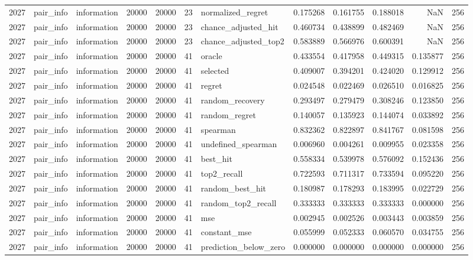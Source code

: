 \begin{tabular}{rllrrrlrrrrr}
2027 & pair_info & information & 20000 & 20000 & 23 & normalized_regret & 0.175268 & 0.161755 & 0.188018 & NaN & 256 \\
2027 & pair_info & information & 20000 & 20000 & 23 & chance_adjusted_hit & 0.460734 & 0.438899 & 0.482469 & NaN & 256 \\
2027 & pair_info & information & 20000 & 20000 & 23 & chance_adjusted_top2 & 0.583889 & 0.566976 & 0.600391 & NaN & 256 \\
2027 & pair_info & information & 20000 & 20000 & 41 & oracle & 0.433554 & 0.417958 & 0.449315 & 0.135877 & 256 \\
2027 & pair_info & information & 20000 & 20000 & 41 & selected & 0.409007 & 0.394201 & 0.424020 & 0.129912 & 256 \\
2027 & pair_info & information & 20000 & 20000 & 41 & regret & 0.024548 & 0.022469 & 0.026510 & 0.016825 & 256 \\
2027 & pair_info & information & 20000 & 20000 & 41 & random_recovery & 0.293497 & 0.279479 & 0.308246 & 0.123850 & 256 \\
2027 & pair_info & information & 20000 & 20000 & 41 & random_regret & 0.140057 & 0.135923 & 0.144074 & 0.033892 & 256 \\
2027 & pair_info & information & 20000 & 20000 & 41 & spearman & 0.832362 & 0.822897 & 0.841767 & 0.081598 & 256 \\
2027 & pair_info & information & 20000 & 20000 & 41 & undefined_spearman & 0.006960 & 0.004261 & 0.009955 & 0.023358 & 256 \\
2027 & pair_info & information & 20000 & 20000 & 41 & best_hit & 0.558334 & 0.539978 & 0.576092 & 0.152436 & 256 \\
2027 & pair_info & information & 20000 & 20000 & 41 & top2_recall & 0.722593 & 0.711317 & 0.733594 & 0.095220 & 256 \\
2027 & pair_info & information & 20000 & 20000 & 41 & random_best_hit & 0.180987 & 0.178293 & 0.183995 & 0.022729 & 256 \\
2027 & pair_info & information & 20000 & 20000 & 41 & random_top2_recall & 0.333333 & 0.333333 & 0.333333 & 0.000000 & 256 \\
2027 & pair_info & information & 20000 & 20000 & 41 & mse & 0.002945 & 0.002526 & 0.003443 & 0.003859 & 256 \\
2027 & pair_info & information & 20000 & 20000 & 41 & constant_mse & 0.055999 & 0.052333 & 0.060570 & 0.034755 & 256 \\
2027 & pair_info & information & 20000 & 20000 & 41 & prediction_below_zero & 0.000000 & 0.000000 & 0.000000 & 0.000000 & 256 \\

\end{tabular}
